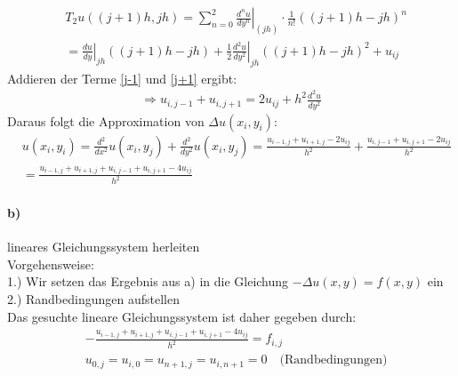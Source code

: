 \begin{align}
&T_2 u((j+1)h, jh)=\sum_{n=0}^2 \left. \frac{d^n u}{dy^n} \right|_{(jh)} \cdot \frac{1}{n!}((j+1)h-jh)^n\\ &=\left.\frac{du}{dy}\right |_{jh} ((j+1)h-jh)+\left.\frac{1}{2}\frac{d^2u}{dy^2}\right|_{jh}((j+1)h-jh)^2+u_{ij}\label{j+1}
\end{align}
Addieren der Terme \eqref{j-1} und \eqref{j+1} ergibt:
\begin{align*}
\Rightarrow u_{i, j-1}+u_{i, j+1}=2u_{ij} + h^2 \frac{d^2u}{dy^2}
\end{align*}
Daraus folgt die Approximation von $\Delta u(x_i,y_i)$:
\begin{align*}
&u(x_i, y_i)=\frac{d^2}{dx^2}u(x_i,y_j)+\frac{d^2}{dy^2}u(x_i,y_j)=\frac{u_{i-1,j}+u_{i+1,j}-2u_{ij}}{h^2}+\frac{u_{i, j-1}+u_{i, j+1}-2u_{ij}}{h^2}\\
&=\frac{u_{i-1,j}+u_{i+1,j}+u_{i, j-1}+u_{i, j+1}-4u_{ij}}{h^2}
\end{align*}
\paragraph*{b)}
lineares Gleichungssystem herleiten\\
\newline
Vorgehensweise:\\
1.) Wir setzen das Ergebnis aus a) in die Gleichung $-\Delta u(x,y)=f(x,y)$ ein\\
2.) Randbedingungen aufstellen\\
\newline
Das gesuchte lineare Gleichungssystem ist daher gegeben durch:
\begin{align*}
&-\frac{u_{i-1,j}+u_{i+1,j}+u_{i, j-1}+u_{i, j+1}-4u_{ij}}{h^2}=f_{i,j}\\
&u_{0,j}=u_{i,0}=u_{n+1,j}=u_{i,n+1}=0 \quad\text{(Randbedingungen)}
\end{align*}

